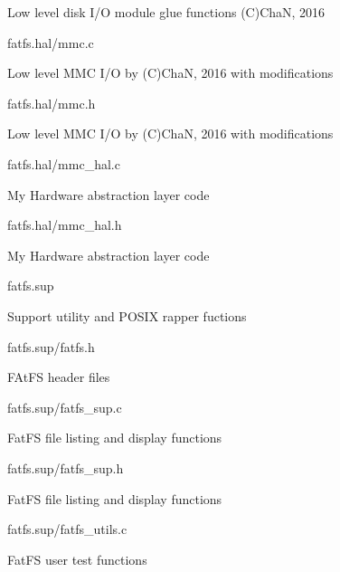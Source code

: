\begin{DoxyPre}
\begin{DoxyItemize}
\begin{DoxyItemize}
\begin{DoxyItemize}
\item Low level disk I/O module glue functions (C)ChaN, 2016
\end{DoxyItemize}
\item fatfs.hal/mmc.c
\begin{DoxyItemize}
\item Low level MMC I/O by (C)ChaN, 2016 with modifications
\end{DoxyItemize}
\item fatfs.hal/mmc.h
\begin{DoxyItemize}
\item Low level MMC I/O by (C)ChaN, 2016 with modifications
\end{DoxyItemize}
\item fatfs.hal/mmc\_hal.c
\begin{DoxyItemize}
\item My Hardware abstraction layer code
\end{DoxyItemize}
\item fatfs.hal/mmc\_hal.h
\begin{DoxyItemize}
\item My Hardware abstraction layer code
\end{DoxyItemize}
\end{DoxyItemize}
\item fatfs.sup
\begin{DoxyItemize}
\item Support utility and POSIX rapper fuctions
\item fatfs.sup/fatfs.h
\begin{DoxyItemize}
\item FAtFS header files
\end{DoxyItemize}
\item fatfs.sup/fatfs\_sup.c
\begin{DoxyItemize}
\item FatFS file listing and display functions
\end{DoxyItemize}
\item fatfs.sup/fatfs\_sup.h
\begin{DoxyItemize}
\item FatFS file listing and display functions
\end{DoxyItemize}
\item fatfs.sup/fatfs\_utils.c
\begin{DoxyItemize}
\item FatFS user test functions
\end{DoxyItemize}

\end{DoxyItemize}
\end{DoxyItemize}
\end{DoxyPre}
